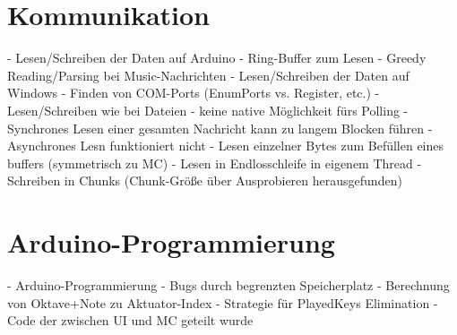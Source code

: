 \section{Kommunikation} \label{umsetzungSW-Kommunikation}
- Lesen/Schreiben der Daten auf Arduino \newline
	- Ring-Buffer zum Lesen \newline
	- Greedy Reading/Parsing bei Music-Nachrichten \newline
- Lesen/Schreiben der Daten auf Windows \newline
	- Finden von COM-Ports (EnumPorts vs. Register, etc.) \newline
	- Lesen/Schreiben wie bei Dateien \newline
	- keine native Möglichkeit fürs Polling \newline
	- Synchrones Lesen einer gesamten Nachricht kann zu langem Blocken führen \newline
	- Asynchrones Lesn funktioniert nicht \newline
	- Lesen einzelner Bytes zum Befüllen eines buffers (symmetrisch zu MC) \newline
	- Lesen in Endlosschleife in eigenem Thread \newline
	- Schreiben in Chunks (Chunk-Größe über Ausprobieren herausgefunden) \newline


\section{Arduino-Programmierung} \label{umsetzungSW-MC}

- Arduino-Programmierung \newline
	- Bugs durch begrenzten Speicherplatz \newline
	- Berechnung von Oktave+Note zu Aktuator-Index \newline
	- Strategie für PlayedKeys Elimination \newline
- Code der zwischen UI und MC geteilt wurde \newline

